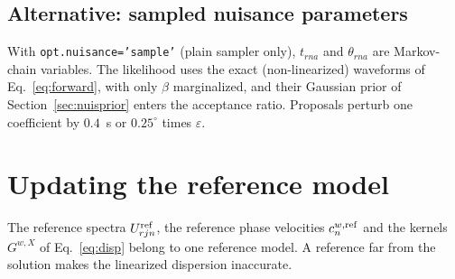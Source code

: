\documentclass[11pt]{article}
\begin{document}
\subsection{Alternative: sampled nuisance parameters}
With \texttt{opt.nuisance='sample'} (plain sampler only), $t_{rna}$ and
$\theta_{rna}$ are Markov-chain variables. The likelihood uses the exact
(non-linearized) waveforms of Eq.~\eqref{eq:forward}, with only $\beta$
marginalized, and their Gaussian prior of Section~\ref{sec:nuisprior}
enters the acceptance ratio. Proposals perturb one coefficient by
$0.4$~s or $0.25^\circ$ times $\varepsilon$.

\section{Updating the reference model}\label{sec:refupd}

The reference spectra $U^{\rm ref}_{rjn}$, the reference phase velocities
$c^{w,\rm ref}_n$ and the kernels $G^{w,X}$ of Eq.~\eqref{eq:disp} belong
to one reference model. A reference far from the solution makes the
linearized dispersion inaccurate.
\end{document}
